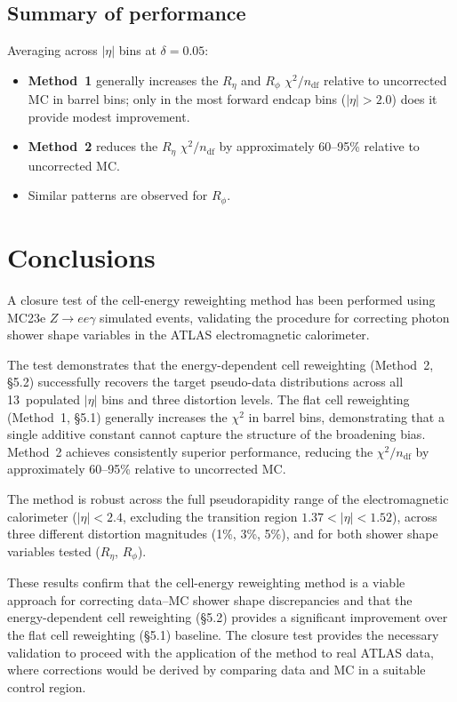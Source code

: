 \documentclass[12pt,a4paper]{article}
\begin{document}
\subsection{Summary of performance}
\label{sec:results:summary}

Averaging across $|\eta|$ bins at $\delta=0.05$:
\begin{itemize}
  \item \textbf{Method~1} generally increases the $R_\eta$ and $R_\phi$
    $\chi^2/n_\text{df}$ relative to uncorrected MC in barrel bins; only in
    the most forward endcap bins ($|\eta|>2.0$) does it provide modest
    improvement.
  \item \textbf{Method~2} reduces the $R_\eta$ $\chi^2/n_\text{df}$ by
    approximately 60--95\% relative to uncorrected MC.
  \item Similar patterns are observed for $R_\phi$.
\end{itemize}

\section{Conclusions}
\label{sec:conclusions}

A closure test of the cell-energy reweighting method has been performed using
MC23e $Z\to ee\gamma$ simulated events, validating the procedure for
correcting photon shower shape variables in the ATLAS electromagnetic
calorimeter.

The test demonstrates that the energy-dependent cell reweighting (Method~2, §5.2)
successfully recovers the target pseudo-data distributions across all
13~populated $|\eta|$ bins and three distortion levels. The flat cell reweighting
(Method~1, §5.1) generally increases the $\chi^2$ in barrel bins,
demonstrating that a single additive constant cannot capture the structure of
the broadening bias. Method~2 achieves consistently superior performance,
reducing the $\chi^2/n_\text{df}$ by approximately 60--95\% relative to
uncorrected MC.

The method is robust across the full pseudorapidity range of the
electromagnetic calorimeter ($|\eta|<2.4$, excluding the transition region
$1.37<|\eta|<1.52$), across three different distortion magnitudes (1\%, 3\%,
5\%), and for both shower shape variables tested ($R_\eta$, $R_\phi$).

These results confirm that the cell-energy reweighting method is a viable
approach for correcting data--MC shower shape discrepancies and that the
energy-dependent cell reweighting (\S5.2) provides a significant improvement over the
flat cell reweighting (\S5.1) baseline. The closure test provides the necessary validation to
proceed with the application of the method to real ATLAS data, where
corrections would be derived by comparing data and MC in a suitable control
region.
\end{document}

